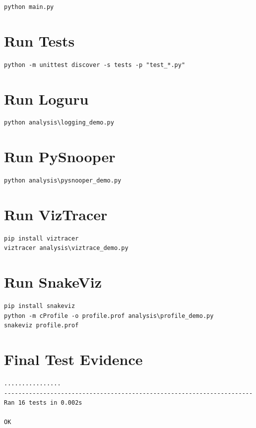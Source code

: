 \documentclass[12pt,a4paper]{report}
\begin{document}
\begin{lstlisting}
python main.py
\end{lstlisting}

\section{Run Tests}

\begin{lstlisting}
python -m unittest discover -s tests -p "test_*.py"
\end{lstlisting}

\section{Run Loguru}

\begin{lstlisting}
python analysis\logging_demo.py
\end{lstlisting}

\section{Run PySnooper}

\begin{lstlisting}
python analysis\pysnooper_demo.py
\end{lstlisting}

\section{Run VizTracer}

\begin{lstlisting}
pip install viztracer
viztracer analysis\viztrace_demo.py
\end{lstlisting}

\section{Run SnakeViz}

\begin{lstlisting}
pip install snakeviz
python -m cProfile -o profile.prof analysis\profile_demo.py
snakeviz profile.prof
\end{lstlisting}

\section{Final Test Evidence}

\begin{lstlisting}
................
----------------------------------------------------------------------
Ran 16 tests in 0.002s

OK
\end{lstlisting}
\end{document}
